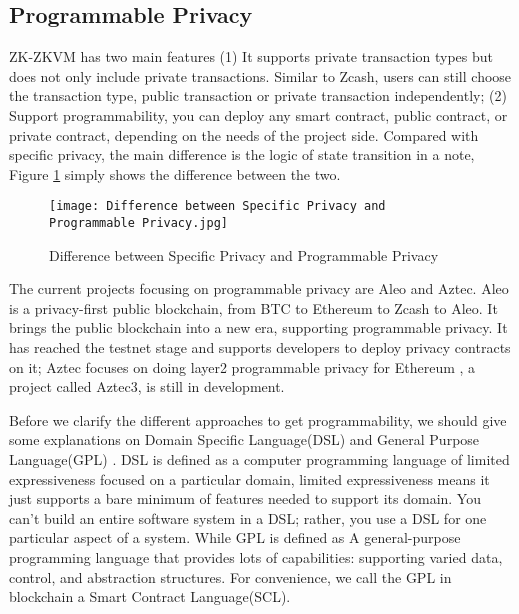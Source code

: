 \subsection{Programmable Privacy}

ZK-ZKVM has two main features (1) It supports private transaction types but does not only include private transactions. Similar to Zcash\cite{website:Zcash}, users can still 
choose the transaction type, public transaction or private transaction independently; 
(2) Support programmability, you can deploy any smart contract, public contract, or 
private contract, depending on the needs of the project side. Compared with specific 
privacy, the main difference is the logic of state transition in a note, Figure \ref{fig:Difference between Specific Privacy and Programmable Privacy} simply shows the difference 
between the two.
\begin{figure}[!ht]
    \centering
    \texttt{[image: Difference between Specific Privacy and Programmable Privacy.jpg]}
    \caption{Difference between Specific Privacy and Programmable Privacy}
    \label{fig:Difference between Specific Privacy and Programmable Privacy}
\end{figure}

The current projects focusing on programmable privacy are Aleo\cite{website:Aleo} and Aztec\cite{website:Aztec}. Aleo\cite{website:Aleo} is a 
privacy-first public blockchain, from BTC\cite{website:BTC} to Ethereum\cite{website:Ethereum} to Zcash\cite{website:Zcash} to Aleo\cite{website:Aleo}. It brings the public blockchain into a new era,
supporting programmable privacy. 
It has reached the testnet stage and supports developers to deploy privacy contracts on it; 
Aztec\cite{website:Aztec} focuses on doing layer2 programmable privacy for Ethereum\cite{website:Ethereum} , a project 
called Aztec3\cite{website:Aztec3}, is still in development.

Before we clarify the different approaches to get programmability, we should give some explanations on Domain Specific Language(DSL) \cite{website:DSL} and General Purpose Language(GPL) \cite{website:DSL}.
DSL\cite{website:DSL} is defined as a computer programming language of limited expressiveness focused on a particular domain, limited expressiveness means it just supports a bare minimum of features 
needed to support its domain. You can't build an entire software system in a DSL; rather, you use a DSL\cite{website:DSL} for one particular aspect of a system. While GPL\cite{website:DSL} is defined as A general-purpose programming language
that provides lots of capabilities: supporting varied data, control, and abstraction structures. For convenience, we call the GPL in blockchain a Smart Contract Language(SCL).

